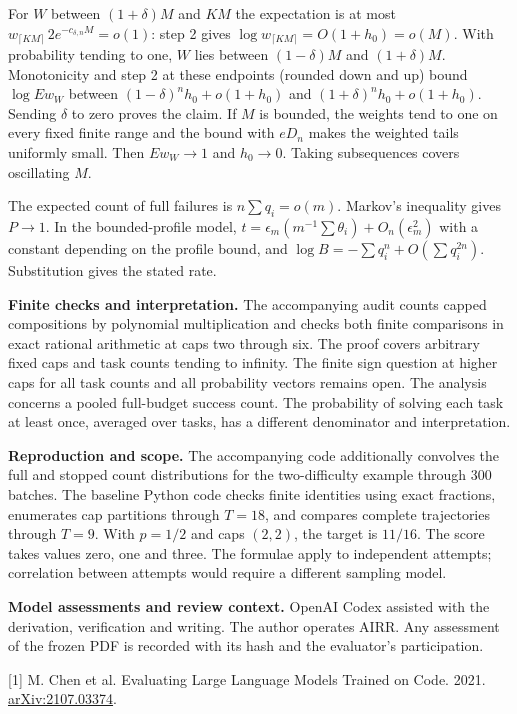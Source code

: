 \documentclass[11pt]{article}
\begin{document}
\newpage
For $W$ between $(1+\delta)M$ and $KM$ the expectation is at most $w_{\lceil KM\rceil}\,2e^{-c_{\delta,n}M}=o(1)$: step 2 gives $\log w_{\lceil KM\rceil}=O(1+h_0)=o(M)$. With probability tending to one, $W$ lies between $(1-\delta)M$ and $(1+\delta)M$. Monotonicity and step 2 at these endpoints (rounded down and up) bound $\log Ew_W$ between $(1-\delta)^n h_0+o(1+h_0)$ and $(1+\delta)^n h_0+o(1+h_0)$. Sending $\delta$ to zero proves the claim. If $M$ is bounded, the weights tend to one on every fixed finite range and the bound with $eD_n$ makes the weighted tails uniformly small. Then $Ew_W\to1$ and $h_0\to0$. Taking subsequences covers oscillating $M$.

The expected count of full failures is $n\sum q_i=o(m)$. Markov's inequality gives $P\to1$. In the bounded-profile model, $t=\epsilon_m(m^{-1}\sum\theta_i)+O_n(\epsilon_m^2)$ with a constant depending on the profile bound, and $\log B=-\sum q_i^n+O(\sum q_i^{2n})$. Substitution gives the stated rate.

\textbf{Finite checks and interpretation.} The accompanying audit counts capped compositions by polynomial multiplication and checks both finite comparisons in exact rational arithmetic at caps two through six. The proof covers arbitrary fixed caps and task counts tending to infinity. The finite sign question at higher caps for all task counts and all probability vectors remains open. The analysis concerns a pooled full-budget success count. The probability of solving each task at least once, averaged over tasks, has a different denominator and interpretation.


\textbf{Reproduction and scope.} The accompanying code additionally convolves the full and stopped count distributions for the two-difficulty example through 300 batches. The baseline Python code checks finite identities using exact fractions, enumerates cap partitions through $T=18$, and compares complete trajectories through $T=9$. With $p=1/2$ and caps $(2,2)$, the target is $11/16$. The score takes values zero, one and three. The formulae apply to independent attempts; correlation between attempts would require a different sampling model.

\textbf{Model assessments and review context.} OpenAI Codex assisted with the derivation, verification and writing. The author operates AIRR. Any assessment of the frozen PDF is recorded with its hash and the evaluator's participation.

\small
[1] M. Chen et al. Evaluating Large Language Models Trained on Code. 2021. \href{https://arxiv.org/abs/2107.03374}{arXiv:2107.03374}.
\end{document}
